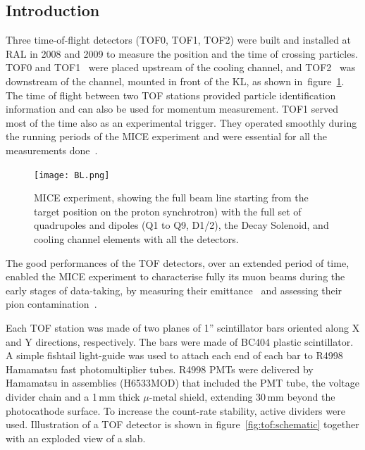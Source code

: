 \subsection{Introduction}
\label{SubSect:TOF_Intro}

Three time-of-flight detectors (TOF0, TOF1, TOF2) were built and
installed at RAL in 2008 and 2009 to measure the position and the time
of crossing particles.  TOF0 and
TOF1~\cite{NOTE145}\cite{NOTE241}\cite{2010NIMPA.615...14B} were
placed upstream of the cooling channel, and TOF2~\cite{NOTE286} was
downstream of the channel, mounted in front of the KL, as shown
in~figure~\ref{fig:BL}.  The time of flight between two TOF stations
provided particle identification information and can also be used for
momentum measurement. TOF1 served most of the time also as an
experimental trigger. They operated smoothly during the 
running periods of the MICE experiment and were essential for all the
measurements done~\cite{Rajaram:2015bra}\cite{2015ehep.confE.521B}.

\begin{figure}[!ht]
  \begin{center}
    \texttt{[image: BL.png]}
    \caption{MICE experiment, showing the full beam line starting from the target position on the proton synchrotron) with the full set of quadrupoles and dipoles (Q1 to Q9, D1/2), the Decay Solenoid, and cooling channel elements with all the detectors.}
    \label{fig:BL}
  \end{center}
\end{figure}

The good performances of the TOF detectors, over an extended period of time,
enabled the MICE experiment to characterise fully its muon beams during
the early stages of data-taking, by measuring their emittance~\cite{2013arXiv1306.1509T} and assessing their pion contamination~\cite{2016JInst..11P3001A}.

Each TOF station was made of two planes of 1'' scintillator
bars oriented along X and Y directions, respectively. The bars were
made of BC404 plastic scintillator. A simple fishtail light-guide was used to attach each end of each bar to R4998 Hamamatsu fast photomultiplier tubes.  R4998 PMTs were delivered by Hamamatsu in assemblies (H6533MOD) that included the PMT tube, the voltage divider
chain and a 1\,mm thick $\mu$-metal shield, extending 30\,mm beyond the
photocathode surface.  To increase the count-rate stability, active
dividers were used. Illustration of a TOF detector is shown in
figure~\ref{fig:tof:schematic} together with an exploded view of a
slab.

